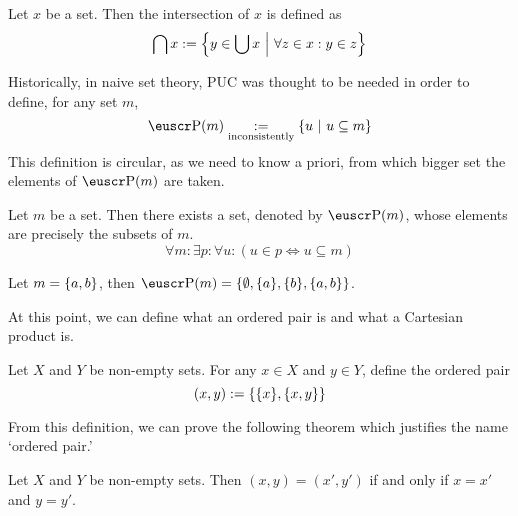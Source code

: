 \begin{definition}
	Let \(x\) be a set. Then the intersection of \(x\) is defined as
	\begin{equation}
		\bigcap x := \qty{y \in \bigcup x \ \middle|\ \forall z \in x: y \in z}
	\end{equation}
\end{definition}
Historically, in naive set theory, PUC was thought to be needed in order to define, for any set \(m\),
\begin{equation*}
	\powerset(m) \underset{\text{inconsistently}}{:=} \qty{u \mid u \subseteq m}
\end{equation*}
This definition is circular, as we need to know a priori, from which bigger set the elements of \(\powerset(m)\) are taken.

\begin{axiom}\label{axiom:P6}
	Let \(m\) be a set. Then there exists a set, denoted by \(\powerset(m)\), whose elements are precisely the subsets of \(m\).
	\begin{equation}
		\forall m: \exists p: \forall u: (u \in p \iff u \subseteq m)
	\end{equation}
\end{axiom}
\begin{example}
	Let \(m = \qty{a, b}\), then \(\powerset(m) = \qty{\0, \qty{a}, \qty{b}, \qty{a, b}}\).
\end{example}
At this point, we can define what an ordered pair is and what a Cartesian product is.
\begin{definition}
	Let \(X\) and \(Y\) be non-empty sets. For any \(x \in X\) and \(y \in Y\), define the ordered pair
	\begin{equation}
		(x, y) := \qty{\qty{x}, \qty{x, y}}
	\end{equation}
\end{definition}
From this definition, we can prove the following theorem which justifies the name `ordered pair.'
\begin{theorem}
	Let \(X\) and \(Y\) be non-empty sets. Then \((x, y) = (x', y')\) if and only if \(x = x'\) and \(y = y'\).
\end{theorem}

